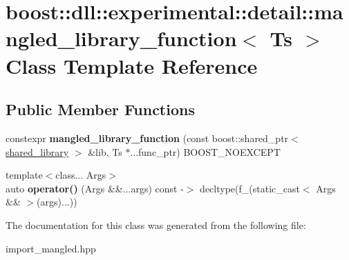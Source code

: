 \hypertarget{a00210}{}\section{boost\+:\+:dll\+:\+:experimental\+:\+:detail\+:\+:mangled\+\_\+library\+\_\+function$<$ Ts $>$ Class Template Reference}
\label{a00210}
\subsection*{Public Member Functions}
\begin{DoxyCompactItemize}
\item 
constexpr {\bfseries mangled\+\_\+library\+\_\+function} (const boost\+::shared\+\_\+ptr$<$ \hyperlink{a00271}{shared\+\_\+library} $>$ \&lib, Ts $\ast$...func\+\_\+ptr) B\+O\+O\+S\+T\+\_\+\+N\+O\+E\+X\+C\+E\+PT\hypertarget{a00210_ac215aeb11aaffbc18a48406973e63de0}{}\label{a00210_ac215aeb11aaffbc18a48406973e63de0}

\item 
{\footnotesize template$<$class... Args$>$ }\\auto {\bfseries operator()} (Args \&\&...args) const  -\/$>$ decltype(f\+\_\+(static\+\_\+cast$<$ Args \&\& $>$(args)...))        \hypertarget{a00210_a489d6b23ed19602672ac22f365f89ddf}{}\label{a00210_a489d6b23ed19602672ac22f365f89ddf}

\end{DoxyCompactItemize}


The documentation for this class was generated from the following file\+:\begin{DoxyCompactItemize}
\item 
import\+\_\+mangled.\+hpp\end{DoxyCompactItemize}
